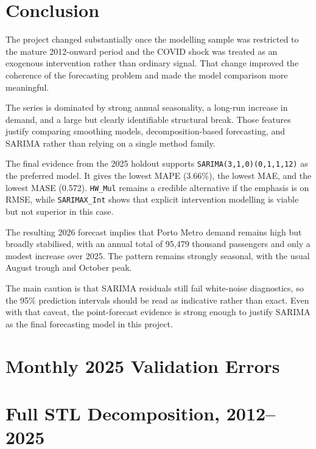 \documentclass[runningheads]{llncs}
\begin{document}
\section{Conclusion}
The project changed substantially once the modelling sample was restricted to the mature 2012-onward period and the COVID shock was treated as an exogenous intervention rather than ordinary signal. That change improved the coherence of the forecasting problem and made the model comparison more meaningful.

The series is dominated by strong annual seasonality, a long-run increase in demand, and a large but clearly identifiable structural break. Those features justify comparing smoothing models, decomposition-based forecasting, and SARIMA rather than relying on a single method family.

The final evidence from the 2025 holdout supports \texttt{SARIMA(3,1,0)(0,1,1,12)} as the preferred model. It gives the lowest MAPE (3.66\%), the lowest MAE, and the lowest MASE (0.572). \texttt{HW\_Mul} remains a credible alternative if the emphasis is on RMSE, while \texttt{SARIMAX\_Int} shows that explicit intervention modelling is viable but not superior in this case.

The resulting 2026 forecast implies that Porto Metro demand remains high but broadly stabilised, with an annual total of 95,479 thousand passengers and only a modest increase over 2025. The pattern remains strongly seasonal, with the usual August trough and October peak.

The main caution is that SARIMA residuals still fail white-noise diagnostics, so the 95\% prediction intervals should be read as indicative rather than exact. Even with that caveat, the point-forecast evidence is strong enough to justify SARIMA as the final forecasting model in this project.

\appendix

\section{Monthly 2025 Validation Errors}


\section{Full STL Decomposition, 2012--2025}


\clearpage
\Needspace{0.62\textheight}
\end{document}
